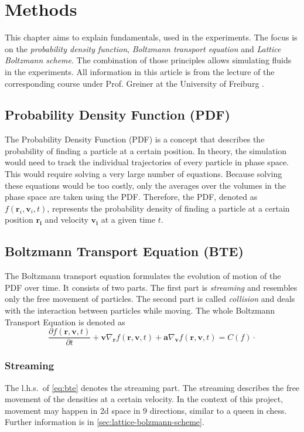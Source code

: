 \chapter{Methods}\label{ch:methods}
This chapter aims to explain fundamentals, used in the experiments.
The focus is on the \textit{probability density function}, \textit{Boltzmann transport equation} and \textit{Lattice Boltzmann scheme}.
The combination of those principles allows simulating fluids in the experiments.
All information in this article is from the lecture of the corresponding course under Prof. Greiner at the University of Freiburg \cite{lecture}.


\section{Probability Density Function (PDF)}\label{sec:probability-density-function-(pdf)}
The Probability Density Function (PDF) is a concept that describes the probability of finding a particle at a certain position.
In theory, the simulation would need to track the individual trajectories of every particle in phase space.
This would require solving a very large number of equations.
Because solving these equations would be too costly, only the averages over the volumes in the phase space are taken using the PDF\@.
Therefore, the PDF, denoted as \(f(\mathbf r_i,\mathbf v_i,t)\), represents the probability density of finding a particle at a certain position \(\mathbf{r_i}\) and velocity \(\mathbf{v_i}\) at a given time \(t\).


\section{Boltzmann Transport Equation (BTE)}
The Boltzmann transport equation formulates the evolution of motion of the PDF over time.
It consists of two parts.
The first part is \textit{streaming} and resembles only the free movement of particles.
The second part is called \textit{collision} and deals with the interaction between particles while moving.
The whole Boltzmann Transport Equation is denoted as
\begin{equation}
    \frac{\partial f\left(\mathbf{r},\mathbf{v},t\right)}{\partial t}+\mathbf{v}\nabla_{\mathbf{r}} f\left(\mathbf{r},\mathbf{v},t\right)
    +\mathbf{a}\nabla_{\mathbf{v}} f\left(\mathbf{r},\mathbf{v},t\right)=C(f)
    \cdot
    \label{eq:bte}
\end{equation}

\subsection{Streaming}\label{subsec:streaming}
The l.h.s.\ of \cref{eq:bte} denotes the streaming part.
The streaming describes the free movement of the densities at a certain velocity.
In the context of this project, movement may happen in 2d space in 9 directions, similar to a queen in chess.
Further information is in \cref{sec:lattice-bolzmann-scheme}.

